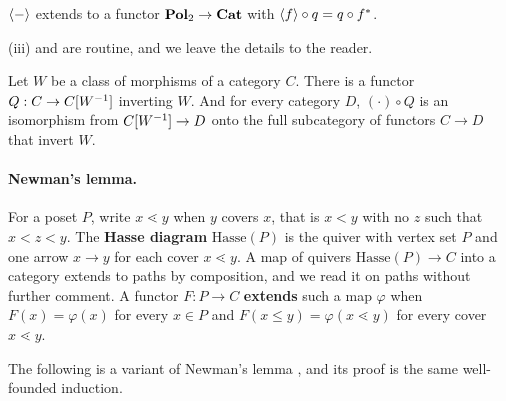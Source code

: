 \documentclass[11pt]{article}
\begin{document}
\begin{lemma}\label{lem:pres-functor}
  $\left\langle - \right\rangle$ extends to a functor $\mathbf{Pol}_2 \to \mathbf{Cat}$ with $\left\langle f \right\rangle \circ q = q \circ f^*$.
\end{lemma}

(iii) and  are routine, and we leave the details to
the reader.

\begin{proposition}\label{prop:loc}
  Let $W$ be a class of morphisms of a category $C$. There is a functor $Q : C \to C[W^{-1}]$
  inverting $W$. And for every category $D$, $(\cdot) \circ Q$ is an isomorphism from
  $C[W^{-1}] \to D$ onto the full subcategory of functors $C \to D$ that
  invert $W$.
\end{proposition}

\paragraph{Newman's lemma.}
For a poset $P$, write $x \lessdot y$ when $y$ covers $x$, that is $x < y$ with no $z$ such that $x < z < y$. 
The \textbf{Hasse diagram} $\mathrm{Hasse}(P)$ is the quiver with vertex set $P$ and
one arrow $x \to y$ for each cover $x \lessdot y$. A map of quivers
$\mathrm{Hasse}(P) \to C$ into a category extends to paths by composition, and we read it on paths
without further comment. A functor $F : P \to C$ \textbf{extends} such a map $\varphi$ when
$F(x) = \varphi(x)$ for every $x \in P$ and $F(x \le y) = \varphi(x \lessdot y)$ for every cover
$x \lessdot y$.

The following is a variant of Newman's lemma \cite[Lem.~1.3.21]{Polygraphs}, and its proof is
the same well-founded induction.
\end{document}
